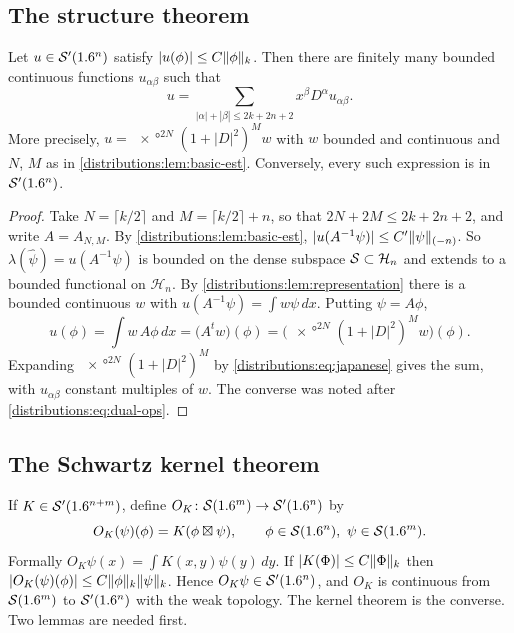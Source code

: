 \subsection{The structure theorem}
\begin{theorem}\label{distributions:thm:structure}
Let $u\in\mathcal{S}'(1.6^n)$ satisfy $|u(\phi)|\le C\lVert \phi\rVert_k$. Then there are finitely many
bounded continuous functions $u_{\alpha\beta}$ such that
\[
  u=\sum_{|\alpha|+|\beta|\le 2k+2n+2}x^\beta D^\alpha u_{\alpha\beta}.
\]
More precisely, $u=\ang{x}^{2N}(1+|D|^2)^Mw$ with $w$ bounded and continuous and
$N$, $M$ as in \cref{distributions:lem:basic-est}. Conversely, every such expression is
in $\mathcal{S}'(1.6^n)$.
\end{theorem}
\begin{proof}
Take $N=\lceil k/2\rceil$ and $M=\lceil k/2\rceil+n$, so that
$2N+2M\le2k+2n+2$, and write $A=A_{N,M}$. By \cref{distributions:lem:basic-est},
$|u(A^{-1}\psi)|\le C'\lVert \psi\rVert_{(-n)}$. So $\lambda(\hat\psi)=u(A^{-1}\psi)$ is
bounded on the dense subspace $\mathcal{S}\subset\mathcal{H}_n$ and extends to a bounded
functional on $\mathcal{H}_n$. By \cref{distributions:lem:representation} there is a
bounded continuous $w$ with $u(A^{-1}\psi)=\int w\psi\,dx$. Putting $\psi=A\phi$,
\[
  u(\phi)=\int w\,A\phi\,dx=\big(A^tw\big)(\phi)=\big(\ang{x}^{2N}(1+|D|^2)^Mw\big)(\phi).
\]
Expanding $\ang{x}^{2N}(1+|D|^2)^M$ by \eqref{distributions:eq:japanese} gives the sum,
with $u_{\alpha\beta}$ constant multiples of $w$. The converse was noted after
\eqref{distributions:eq:dual-ops}.
\end{proof}

\subsection{The Schwartz kernel theorem}
If $K\in\mathcal{S}'(1.6^{n+m})$, define $O_K\colon\mathcal{S}(1.6^m)\to\mathcal{S}'(1.6^n)$ by
\begin{equation}\label{distributions:eq:OK}
  O_K(\psi)(\phi)=K(\phi\boxtimes\psi),\qquad\phi\in\cS(\R^n),\ \psi\in\cS(\R^m).
\end{equation}
Formally $O_K\psi(x)=\int K(x,y)\psi(y)\,dy$. If $|K(\Phi)|\le C\lVert \Phi\rVert_k$ then
$|O_K(\psi)(\phi)|\le C\lVert \phi\rVert_k\lVert \psi\rVert_k$. Hence $O_K\psi\in\mathcal{S}'(1.6^n)$, and
$O_K$ is continuous from $\mathcal{S}(1.6^m)$ to $\mathcal{S}'(1.6^n)$ with the weak topology. The kernel
theorem is the converse. Two lemmas are needed first.

